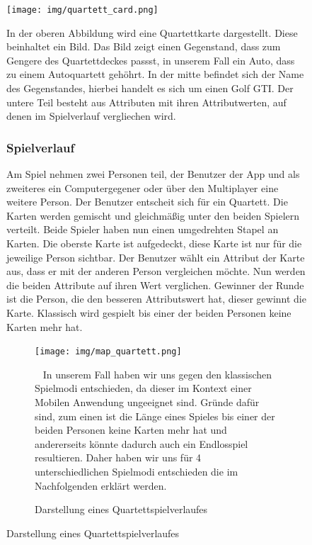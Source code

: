 \documentclass{scrartcl}
\begin{document}
\begin{figure}[!ht]
\begin{center}
    \texttt{[image: img/quartett\_card.png]}
    \caption{Golf GTI Quartettkarte aus einem Autoquartett}
\end{center}

In der oberen Abbildung wird eine Quartettkarte dargestellt. Diese beinhaltet 
ein Bild. Das Bild zeigt einen Gegenstand, dass zum Gengere des Quartettdeckes
passst, in unserem Fall ein Auto, dass zu einem Autoquartett gehöhrt. In der 
mitte befindet sich der Name des Gegenstandes, hierbei handelt es sich um einen
Golf GTI. Der untere Teil besteht aus Attributen mit ihren Attributwerten, 
auf denen im Spielverlauf vergliechen wird.

\subsubsection{Spielverlauf}

Am Spiel nehmen zwei Personen teil, der Benutzer der App und als zweiteres
ein Computergegener oder über den Multiplayer eine weitere Person. Der Benutzer
entscheit sich für ein Quartett. Die Karten werden gemischt und gleichmäßig unter 
den beiden Spielern verteilt. Beide Spieler haben nun einen umgedrehten Stapel 
an Karten. Die oberste Karte ist aufgedeckt, diese Karte ist nur für die jeweilige
Person sichtbar. Der Benutzer wählt ein Attribut der Karte aus, dass er mit der 
anderen Person vergleichen möchte. Nun werden die beiden Attribute auf ihren 
Wert verglichen. Gewinner der Runde ist die Person, die den besseren 
Attributswert hat, dieser gewinnt die Karte. Klassisch wird gespielt bis einer 
der beiden Personen keine Karten mehr hat. 

\begin{figure}[!ht]
\begin{center}
    \texttt{[image: img/map\_quartett.png]}
    \caption{Darstellung eines Quartettspielverlaufes}
\end{center}

\ \newline
In unserem Fall haben wir uns gegen 
den klassischen Spielmodi entschieden, da dieser im Kontext einer Mobilen 
Anwendung ungeeignet sind. Gründe dafür sind, zum einen ist die Länge eines 
Spieles bis einer der beiden Personen keine Karten mehr hat und andererseits 
könnte dadurch auch ein Endlosspiel resultieren.
\newline
Daher haben wir uns für 4 unterschiedlichen Spielmodi entschieden die im 
Nachfolgenden erklärt werden.


\end{figure}
\end{figure}
\end{document}
